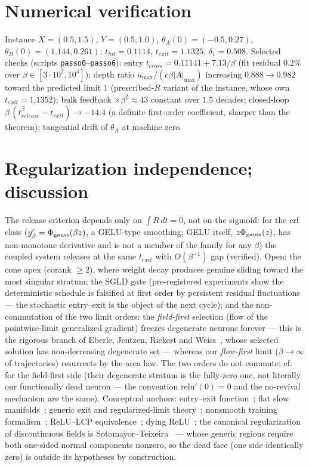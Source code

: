 \documentclass[11pt]{article}
\begin{document}
\section{Numerical verification}\label{sec:num}
Instance $X=(0.5,1.5)$, $Y=(0.5,1.0)$, $\theta_A(0)=(-0.5,0.27)$,
$\theta_B(0)=(1.144,0.261)$; $t_{hit}=0.1114$, $t_{exit}=1.1325$,
$\delta_1=0.508$. Selected checks (scripts \texttt{passo0}--\texttt{passo6}):
entry $t_{cross}=0.11141+7.13/\beta$ (fit residual $0.2\%$ over
$\beta\in[3\cdot10^2,10^4]$); depth ratio $u_{\max}/(c\beta|A|_{\max})$ increasing $0.888\to0.982$ toward
the predicted limit $1$ (prescribed-$R$ variant of the instance, whose own
$t_{exit}=1.1352$);
bulk feedback $\times\beta^2\approx43$ constant over $1.5$ decades; closed-loop
$\beta\,(t^\beta_{release}-t_{exit})\to-14.4$ (a definite first-order
coefficient, sharper than the theorem); tangential drift of $\theta_A$ at
machine zero.

\section{Regularization independence; discussion}\label{sec:reg}
The release criterion depends only on $\int R\,dt=0$, not on the sigmoid: for
the erf class ($g_\beta'=\Phi_{\rm gauss}(\beta z)$, a GELU-type smoothing;
GELU itself, $z\Phi_{\rm gauss}(z)$, has non-monotone derivative and is not a
member of the family for any $\beta$) the coupled system releases at the same $t_{exit}$ with
$O(\beta^{-1})$ gap (verified). Open: the cone apex (corank $\ge2$), where
weight decay produces genuine sliding toward the most singular stratum; the
SGLD gate (pre-registered experiments show the deterministic schedule is
falsified at first order by persistent residual fluctuations --- the stochastic
entry--exit is the object of the next cycle); and the non-commutation of the two limit orders: the \emph{field-first}
selection (flow of the pointwise-limit generalized gradient) freezes degenerate
neurons forever --- this is the rigorous branch of Eberle, Jentzen, Riekert and
Weiss~\cite{EJRW23}, whose selected solution has non-decreasing degenerate set
--- whereas our \emph{flow-first} limit ($\beta\to\infty$ of trajectories)
resurrects by the area law. The two orders do not commute; cf.~\cite{EJRW23}
for the field-first side (their degenerate stratum is the fully-zero one, not
literally our functionally dead neuron --- the convention $\mathrm{relu}'(0)=0$
and the no-revival mechanism are the same). Conceptual anchors: entry--exit
function~\cite{DMS16,SDR23}; flat slow manifolds~\cite{Kri17}; generic exit
and regularized-limit theory~\cite{Jef16,GH}; nonsmooth training
formalism~\cite{BP21}; ReLU--LCP equivalence~\cite{APM20}; dying
ReLU~\cite{Lu19}; the canonical regularization of discontinuous fields is
Sotomayor--Teixeira~\cite{ST98,LST07} --- whose generic regions require both
one-sided normal components nonzero, so the dead face (one side identically
zero) is outside its hypotheses by construction.
\end{document}

